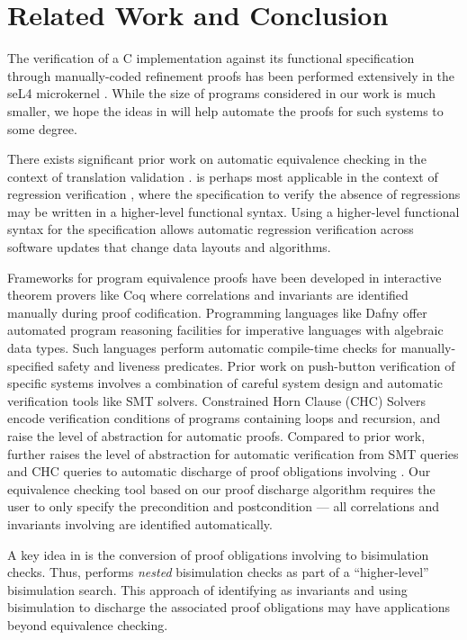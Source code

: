 \section{Related Work and Conclusion}
\label{sec:relwork}
The verification of a C implementation against
its functional specification through manually-coded
refinement proofs has been performed
extensively in the seL4 microkernel \cite{seL4}.
While the size of programs
considered in our work is much smaller,
we hope the ideas in \toolName{} will help
automate the proofs for such systems to some degree.

There exists significant prior work on automatic
equivalence checking in the context of
translation
validation \cite{tvi,tristan_tv_eqsat11,stepp_eqsat_llvm11,eqsat,pec,zuck03,zuck05,heffter05,covac,c_to_verilog,kanade09,lopes16,tvoc_cav05,ddec,semalign,oopsla20,tv_oskernel,namjoshi13}.
\toolName{} is perhaps most applicable in the context of
regression verification \cite{strichman_regressverify,felsing14}, where
the specification to verify the absence of regressions may be written
in a higher-level functional syntax. Using
a higher-level functional syntax for the specification
allows automatic regression verification across software updates
that change
data layouts and algorithms.

Frameworks for program equivalence proofs have been developed
in interactive theorem provers like Coq \cite{programEquivalenceInCoq}
where correlations and invariants are identified manually during
proof codification.
Programming languages like Dafny \cite{dafny} offer automated program
reasoning facilities for imperative languages with
algebraic data types. Such languages perform automatic
compile-time checks
for manually-specified safety
and liveness predicates. Prior work on push-button
verification of specific
systems \cite{fscq,hyperkernel,serval,verifiedBPF}
involves a combination
of careful system design and
automatic verification tools like SMT solvers.
Constrained Horn Clause (CHC) Solvers \cite{CHCeq}
encode verification
conditions of programs containing loops and recursion,
and raise the level of abstraction for automatic proofs.
Compared to prior work, \toolName{} further raises the level
of abstraction for automatic verification from
SMT queries and CHC queries to automatic discharge of
proof obligations involving \recursiveRelations{}.
Our equivalence checking tool based on
our proof discharge algorithm requires the user
to only specify the precondition and
postcondition --- all
correlations and invariants involving \recursiveRelations{}
are identified automatically.

A key idea in \toolName{}
is the conversion of proof
obligations involving \recursiveRelations{} to
bisimulation checks. Thus, \toolName{}
performs {\em nested}
bisimulation checks as part
of a ``higher-level''
bisimulation search. This approach of
identifying \recursiveRelations{} as invariants and using
bisimulation to discharge the associated
proof obligations may have applications
beyond equivalence checking.